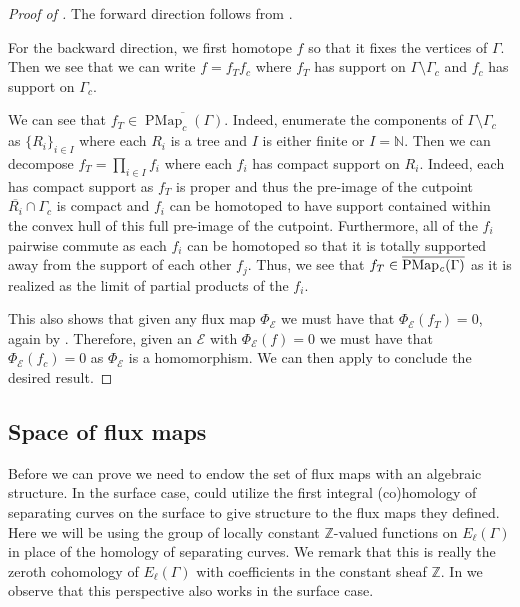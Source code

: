 \documentclass[11pt]{amsart}
\theoremstyle{plain}
\theoremstyle{definition}
\DeclareMathOperator{\PMap}{PMap}
\DeclareMathOperator{\PMapc}{PMap_{\it c}}
\newcommand{\N}{\mathbb{N}}
\newcommand{\Z}{\mathbb{Z}}
\newcommand{\cE}{\mathcal{E}}
\def\G{{\Gamma}}
\newcommand{\<}{\langle}
\renewcommand{\>}{\rangle}
\newcommand{\cech}{\text{{\v C}ech}}
\begin{document}
\begin{proof}[Proof of ]
    The forward direction follows from .

    For the backward direction, we first homotope $f$ so that it fixes the vertices of $\G$. Then we see that we can write $f=f_{T}f_{c}$ where $f_{T}$ has support on $\G \setminus \G_{c}$ and $f_{c}$ has support on $\G_{c}$. 

    We can see that $f_{T} \in \overline{\PMap_{c}(\G)}$. Indeed, enumerate the components of $\G\setminus \G_{c}$ as $\{R_{i}\}_{i\in I}$ where each $R_{i}$ is a tree and $I$ is either finite or $I=\N$. Then we can decompose $f_{T} = \prod_{i\in I} f_{i}$ where each $f_{i}$ has compact support on $R_{i}$. Indeed, each has compact support as $f_{T}$ is proper and thus the pre-image of the cutpoint $\overline{R_{i}} \cap \G_{c}$ is compact and $f_{i}$ can be homotoped to have support contained within the convex hull of this full pre-image of the cutpoint. Furthermore, all of the $f_{i}$ pairwise commute as each $f_{i}$ can be homotoped so that it is totally supported away from the support of each other $f_{j}$. Thus, we see that $f_{T} \in \overline{\PMapc(\G)}$ as it is realized as the limit of partial products of the $f_{i}$. 

    This also shows that given any flux map $\Phi_{\cE}$ we must have that $\Phi_{\cE}(f_{T}) = 0$, again by . Therefore, given an $\cE$ with $\Phi_{\cE}(f) = 0$ we must have that $\Phi_{\cE}(f_{c})=0$ as $\Phi_\cE$ is a homomorphism. We can then apply  to conclude the desired result. 
\end{proof}

\subsection{Space of flux maps}\label{ssec:SpaceOfFluxmaps}

Before we can prove  we need to endow the set of flux maps with an algebraic structure. In the surface case, \cite{APV2020} could utilize the first integral (co)homology of separating curves on the surface to give structure to the flux maps they defined. Here we will be using the group of locally constant $\Z$-valued functions on $E_{\ell}(\G)$ in place of the homology of separating curves. We remark that this is really the zeroth \cech{} cohomology of $E_{\ell}(\G)$ with coefficients in the constant sheaf $\Z$. In  we observe that this perspective also works in the surface case. 
\end{document}

